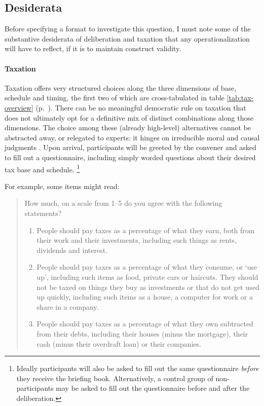 \subsection{Desiderata}
Before specifying a format to investigate this question, I must note some of the substantive desiderata of deliberation and taxation that any operationalization will have to reflect, if it is to maintain construct validity.

\paragraph{Taxation}
Taxation offers very structured choices along the three dimensions of base, schedule and timing, the first two of which are cross-tabulated in table \ref{tab:tax-overview} (p.~\pageref{tab:tax-overview}).
There can be no meaningful democratic rule on taxation that does not ultimately opt for a definitive mix of distinct combinations along those dimensions.
The choice among these (already high-level) alternatives cannot be abstracted away, or relegated to experts:
it hinges on irreducible moral and causal judgments \citep[for example, ][]{McCaffery2005}.
Upon arrival, participants will be greeted by the convener and asked to fill out a questionnaire, including simply worded questions about their desired tax base and schedule.
\footnote{
	Ideally participants will also be asked to fill out the same questionnaire \emph{before} they receive the briefing book.
	Alternatively, a control group of non-participants may be asked to fill out the questionnaire before and after the deliberation.
}

For example, some items might read:
\begin{quote}
	How much, on a scale from 1--5 do you agree with the following statements?

	\begin{enumerate}
		\item People should pay taxes as a percentage of what they earn, both from their work and their investments, including such things as rents, dividends and interest.

		\item People should pay taxes as a percentage of what they consume, or `use up', including such items as food, private cars or haircuts.
		They should not be taxed on things they buy as investments or that do not get used up quickly, including such items as a house, a computer for work or a share in a company.

		\item People should pay taxes as a percentage of what they own subtracted from their debts, including their houses (minus the mortgage), their cash (minus their overdraft loan) or their companies.
	\end{enumerate}
\end{quote}

